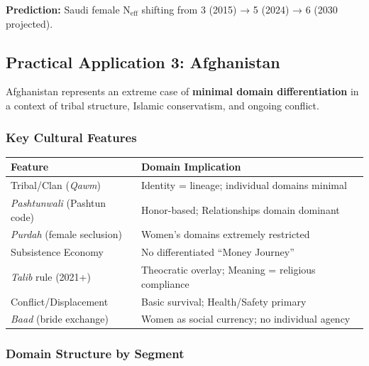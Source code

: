 \textbf{Prediction:} Saudi female N$_{\text{eff}}$ shifting from 3 (2015) → 5 (2024) → 6 (2030 projected).


\subsection{Practical Application 3: Afghanistan}
\label{sec:bj-afghanistan}

Afghanistan represents an extreme case of \textbf{minimal domain differentiation} in a context of tribal structure, Islamic conservatism, and ongoing conflict.

\subsubsection{Key Cultural Features}

\begin{center}
\begin{tabular}{@{}lp{7cm}@{}}
\toprule
\textbf{Feature} & \textbf{Domain Implication} \\
\midrule
Tribal/Clan (\textit{Qawm}) & Identity = lineage; individual domains minimal \\
\textit{Pashtunwali} (Pashtun code) & Honor-based; Relationships domain dominant \\
\textit{Purdah} (female seclusion) & Women's domains extremely restricted \\
Subsistence Economy & No differentiated ``Money Journey'' \\
\textit{Talib} rule (2021+) & Theocratic overlay; Meaning = religious compliance \\
Conflict/Displacement & Basic survival; Health/Safety primary \\
\textit{Baad} (bride exchange) & Women as social currency; no individual agency \\
\bottomrule
\end{tabular}
\end{center}

\subsubsection{Domain Structure by Segment}

